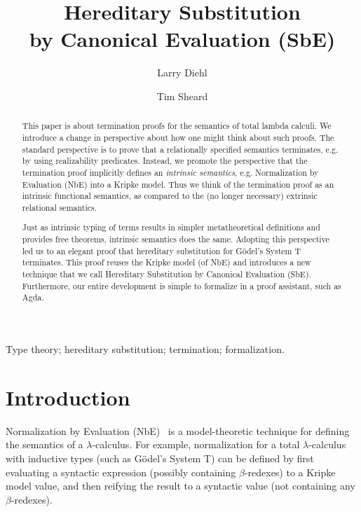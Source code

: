 \documentclass{llncs}
\newcommand{\by}[1]{(#1)}
\begin{document}
\frontmatter
\pagestyle{headings}

\title{Hereditary Substitution \\by Canonical Evaluation (SbE)}

\author{Larry Diehl \and Tim Sheard}


\maketitle

\begin{abstract}

This paper is about termination proofs for the semantics of total lambda calculi.
We introduce a change in perspective about how one might
think about such proofs. The standard perspective is to prove that a relationally
specified semantics terminates, e.g. by using realizability predicates. Instead,
we promote the perspective that the termination proof implicitly defines
an \textit{intrinsic semantics}, e.g. Normalization by Evaluation (NbE) into a Kripke model.
Thus we think of the termination proof as an intrinsic functional semantics, as compared
to the (no longer necessary) extrinsic relational semantics.

Just as intrinsic typing of terms results in simpler metatheoretical definitions and provides
free theorems, intrinsic semantics does the same. Adopting this perspective
led us to an elegant proof
that hereditary substitution for G{\"o}del's System T terminates. This proof
reuses the Kripke model (of NbE) and introduces a new technique that we call
Hereditary Substitution by Canonical Evaluation (SbE). Furthermore,
our entire development is simple to formalize in a proof assistant, such as Agda.
\end{abstract}


\keywords
Type theory; hereditary substitution; termination; formalization.

\section{Introduction}
\label{sec:intro}

Normalization by Evaluation (NbE)~\cite{TODO} is a model-theoretic
technique for defining the semantics of a $\lambda$-calculus. For
example, normalization for a total $\lambda$-calculus with inductive
types (such as G{\"o}del's System T) can be defined by first
evaluating a syntactic expression (possibly containing $\beta$-redexes) to a
Kripke model value, and then reifying the result to a syntactic value
(not containing any $\beta$-redexes).
\end{document}
